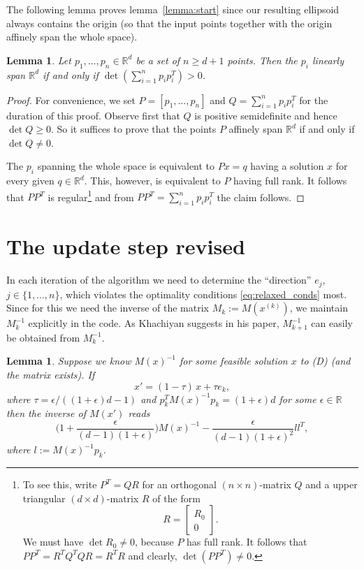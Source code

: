 \documentclass[a4paper,twocolumn]{article}
\newcommand{\R}{\ensuremath{\mathbb{R}}}
\newtheorem{lemma}[theorem]{Lemma}
\begin{document}
The following lemma proves lemma~\ref{lemma:start} since our resulting
ellipsoid always contains the origin (so that the input points
together with the origin affinely span the whole space).
%
\begin{lemma}
   Let $p_1,\ldots,p_n\in\R^d$ be a set of $n\ge d+1$ points.  Then
   the $p_i$ linearly span $\R^d$ if and only if $\det(\sum_{i=1}^n
   p_i p_i^T)>0$.
\end{lemma}
%
\begin{proof}
  For convenience, we set $P = [p_1,\ldots,p_n]$ and $Q=\sum_{i=1}^n
  p_i p_i^T$ for the duration of this proof.  Observe first that $Q$
  is positive semidefinite and hence $\det Q \ge 0$.  So it suffices
  to prove that the points $P$ affinely span $\R^d$ if and only if
  $\det Q \not=0$.
  
  The $p_i$ spanning the whole space is equivalent to $Px=q$ having a
  solution $x$ for every given $q\in\R^d$.  This, however, is
  equivalent to $P$ having full rank.  It follows that $PP^T$ is
  regular\footnote{To see this, write $P^T = QR$ for an orthogonal
  $(n\times n)$-matrix $Q$ and a upper triangular $(d\times d)$-matrix
  $R$ of the form
  \[ R = \left[
  \begin{array}{c}
  R_0 \\ 0
  \end{array}
  \right].
  \]
  We must have $\det R_0\not=0$, because $P$ has full rank.  It
  follows that $PP^T = R^TQ^T Q R = R^T R$ and clearly,
  $\det(PP^T)\not=0$.} and from $PP^T = \sum_{i=1}^n p_i p_i^T$ the
  claim follows.
\end{proof}

\section{The update step revised}
In each iteration of the algorithm we need to determine the
``direction'' $e_j$, $j\in\{1,\ldots,n\}$, which violates the
optimality conditions \eqref{eq:relaxed_conds} most.  Since for this
we need the inverse of the matrix $M_k:= M(x^{(k)})$, we maintain
$M_k^{-1}$ explicitly in the code.  As Khachiyan suggests in his
paper, $M_{k+1}^{-1}$ can easily be obtained from $M_k^{-1}$.

\begin{lemma}
  \label{lm:rank-1}
  Suppose we know $M(x)^{-1}$ for some feasible solution $x$ to (D)
  (and the matrix exists).  If
  \[
  x' = (1-\tau)\, x + \tau e_k,
  \]
  where $\tau = \epsilon/((1+\epsilon)d - 1)$ and $p_k^T M(x)^{-1} p_k
  = (1+\epsilon)d$ for some $\epsilon\in\R$ then the inverse of
  $M(x')$ reads
  \[
    \Big(
      1+\frac{\epsilon}{(d-1)(1+\epsilon)}
    \Big) M(x)^{-1} 
    -
    \frac{\epsilon}{(d-1)(1+\epsilon)^2} l l^T,
  \]
  where $l:= M(x)^{-1} p_k$.
\end{lemma}
\end{document}
